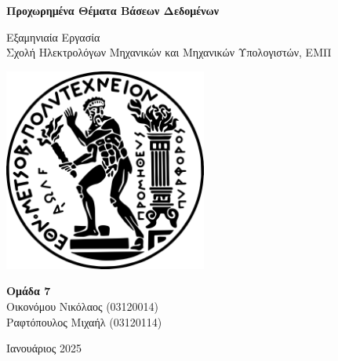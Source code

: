 \documentclass[a4paper,12pt]{article}
\begin{document}
\begin{otherlanguage}{greek}

\begin{titlepage}
    	\centering
    	\vspace*{2cm}

    	\Huge
    	\textbf{Προχωρημένα Θέματα Βάσεων Δεδομένων}

    	\vspace{0.5cm}
    	\LARGE
    	Εξαμηνιαία Εργασία \\
	\Large
    	Σχολή Ηλεκτρολόγων Μηχανικών και Μηχανικών Υπολογιστών, ΕΜΠ

    	\vspace{1.5cm}
    	\includegraphics[width=0.5\textwidth]{ntua.png}

    	\vfill

   	\Large
	\textbf{Ομάδα 7} \\
	Οικονόμου Νικόλαος (03120014) \\
	Ραφτόπουλος Μιχαήλ (03120114) \\

	\vfill

	\normalsize
    	Ιανουάριος 2025

    	\vspace{0.8cm}
\end{titlepage}

\newpage

\tableofcontents
\newpage



\end{otherlanguage}
\end{document}
